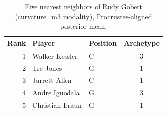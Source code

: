 \begin{table}[htbp]
  \centering\small
  \begin{tabular}{rllc}
    \toprule
    Rank & Player & Position & Archetype \\
    \midrule
    1 & Walker Kessler & C & 3 \\
    2 & Tre Jones & G & 1 \\
    3 & Jarrett Allen & C & 1 \\
    4 & Andre Iguodala & G & 3 \\
    5 & Christian Braun & G & 1 \\
    \bottomrule
  \end{tabular}
  \caption{Five nearest neighbors of Rudy Gobert (curvature_m3 modality), Procrustes-aligned posterior mean.}
  \label{tab:Rudy_Gobert_neighbors_curvature_m3}
\end{table}

